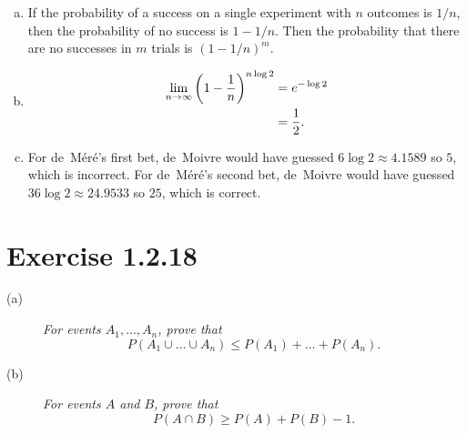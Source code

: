 \documentclass{tufte-handout}
\begin{document}
\begin{enumerate}[(a)]
\item If the probability of a success on a single experiment with $n$
  outcomes is $1/n$, then the probability of no success is $1 -
  1/n$. Then the probability that there are no successes in $m$ trials
  is ${(1 - 1/n)}^m$.
\item
  \begin{align*}
    \lim_{n \rightarrow \infty} {\left( 1 - {1 \over n}\right)}^{n
    \log 2} &= e^{ -\log 2} \\
            &= {1 \over 2}.
  \end{align*}
\item For de~M\'er\'e's first bet, de~Moivre would have guessed $6
  \log 2 \approx 4.1589$ so $5$, which is incorrect. For de~M\'er\'e's
  second bet, de~Moivre would have guessed $36 \log 2 \approx 24.9533$
  so $25$, which is correct.
\end{enumerate}

\section{Exercise 1.2.18}

\begin{description}
\item[(a)] \textit{For events $A_1,\dots, A_n$, prove that
  \[
  P(A_1 \cup \dots \cup A_n) \leq P(A_1) + \dots + P(A_n).
  \]}
\item[(b)] \textit{For events $A$ and $B$, prove that
  \[
  P(A \cap B) \geq P(A) + P(B) - 1.
  \]}
\end{description}
\end{document}

